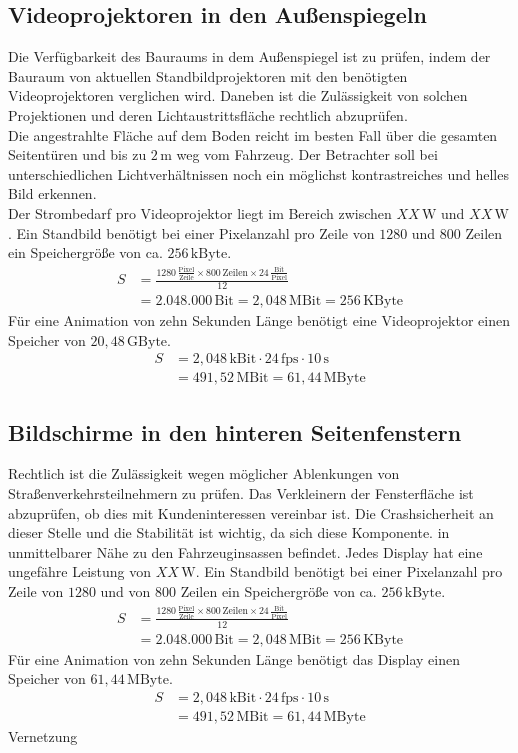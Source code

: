 \subsection{Videoprojektoren in den Außenspiegeln}
Die Verfügbarkeit des Bauraums in dem Außenspiegel ist zu prüfen, indem der Bauraum von aktuellen Standbildprojektoren mit den benötigten Videoprojektoren verglichen wird. 
Daneben ist die Zulässigkeit von solchen Projektionen und deren Lichtaustrittsfläche rechtlich abzuprüfen. \\
Die angestrahlte Fläche auf dem Boden reicht im besten Fall über die gesamten Seitentüren und bis zu $ 2\,\mathrm{m} $ weg vom Fahrzeug.
Der Betrachter soll bei unterschiedlichen Lichtverhältnissen noch ein möglichst kontrastreiches und helles Bild erkennen. \\
Der Strombedarf pro Videoprojektor liegt im Bereich zwischen $ XX\,\mathrm{W} $ und $ XX\,\mathrm{W} $.
Ein Standbild benötigt bei einer Pixelanzahl pro Zeile von $ 1280 $ und $ 800 $ Zeilen ein Speichergröße von ca. $ 256\,\mathrm{kByte}$. 
\begin{align}
	S &= \frac{1280\,\frac{\mathrm{Pixel}}{\mathrm{Zeile}} \times 800\,\mathrm{Zeilen} \times 24\,\frac{\mathrm{Bit}}{\mathrm{Pixel}}}{12} \\
	&= 2.048.000\,\mathrm{Bit} = 2,048\,\mathrm{MBit} = 256\,\mathrm{KByte}
\end{align}
Für eine Animation von zehn Sekunden Länge benötigt eine Videoprojektor einen Speicher von $ 20,48\,\mathrm{GByte}$.
\begin{align}
	S &= 2,048\,\mathrm{kBit} \cdot 24\,\mathrm{fps} \cdot 10\,\mathrm{s}\\
	&= 491,52\,\mathrm{MBit} = 61,44\,\mathrm{MByte}
\end{align}
\subsection{Bildschirme in den hinteren Seitenfenstern}
Rechtlich ist die Zulässigkeit wegen möglicher Ablenkungen von Straßenverkehrsteilnehmern zu prüfen.
Das Verkleinern der Fensterfläche ist abzuprüfen, ob dies mit Kundeninteressen vereinbar ist.
Die Crashsicherheit an dieser Stelle und die Stabilität ist wichtig, da sich diese Komponente. in unmittelbarer Nähe zu den Fahrzeuginsassen befindet.
Jedes Display hat eine ungefähre Leistung von $ XX\,\mathrm{W} $. 
Ein Standbild benötigt bei einer Pixelanzahl pro Zeile von $ 1280 $ und von $ 800 $ Zeilen ein Speichergröße von ca. $ 256\,\mathrm{kByte}$. 
\begin{align}
	S &= \frac{1280\,\frac{\mathrm{Pixel}}{\mathrm{Zeile}}\times 800\,\mathrm{Zeilen} \times 24\,\frac{\mathrm{Bit}}{\mathrm{Pixel}}}{12} \\
	&= 2.048.000\,\mathrm{Bit} = 2,048\,\mathrm{MBit} = 256\,\mathrm{KByte}
\end{align}
Für eine Animation von zehn Sekunden Länge benötigt das Display einen Speicher von $ 61,44\,\mathrm{MByte}$.
\begin{align}
	S &= 2,048\,\mathrm{kBit} \cdot 24\,\mathrm{fps} \cdot 10\,\mathrm{s}\\
	&= 491,52\,\mathrm{MBit} = 61,44\,\mathrm{MByte}
\end{align}
Vernetzung
